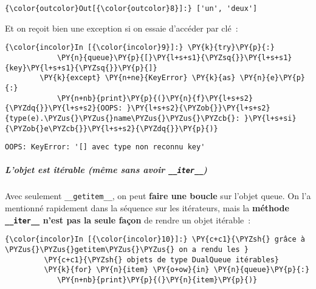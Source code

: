 \begin{Verbatim}[commandchars=\\\{\},frame=single,framerule=0.3mm,rulecolor=\color{cellframecolor}]
{\color{outcolor}Out[{\color{outcolor}8}]:} ['un', 'deux']
\end{Verbatim}
            
    Et on reçoit bien une exception si on essaie d'accéder par clé~:

    \begin{Verbatim}[commandchars=\\\{\},frame=single,framerule=0.3mm,rulecolor=\color{cellframecolor}]
{\color{incolor}In [{\color{incolor}9}]:} \PY{k}{try}\PY{p}{:}
            \PY{n}{queue}\PY{p}{[}\PY{l+s+s1}{\PYZsq{}}\PY{l+s+s1}{key}\PY{l+s+s1}{\PYZsq{}}\PY{p}{]}
        \PY{k}{except} \PY{n+ne}{KeyError} \PY{k}{as} \PY{n}{e}\PY{p}{:}
            \PY{n+nb}{print}\PY{p}{(}\PY{n}{f}\PY{l+s+s2}{\PYZdq{}}\PY{l+s+s2}{OOPS: }\PY{l+s+s2}{\PYZob{}}\PY{l+s+s2}{type(e).\PYZus{}\PYZus{}name\PYZus{}\PYZus{}\PYZcb{}: }\PY{l+s+si}{\PYZob{}e\PYZcb{}}\PY{l+s+s2}{\PYZdq{}}\PY{p}{)}
\end{Verbatim}


    \begin{Verbatim}[commandchars=\\\{\},frame=single,framerule=0.3mm,rulecolor=\color{cellframecolor}]
OOPS: KeyError: '[] avec type non reconnu key'
\end{Verbatim}

    \hypertarget{lobjet-est-ituxe9rable-muxeame-sans-avoir-__iter__}{%
\subparagraph{\texorpdfstring{L'objet est itérable (même sans avoir
\texttt{\_\_iter\_\_})}{L'objet est itérable (même sans avoir \_\_iter\_\_)}}\label{lobjet-est-ituxe9rable-muxeame-sans-avoir-__iter__}}

    Avec seulement \texttt{\_\_getitem\_\_}, on peut \textbf{faire une
boucle} sur l'objet queue. On l'a mentionné rapidement dans la séquence
sur les itérateurs, mais la \textbf{méthode \texttt{\_\_iter\_\_} n'est
pas la seule façon} de rendre un objet itérable~:

    \begin{Verbatim}[commandchars=\\\{\},frame=single,framerule=0.3mm,rulecolor=\color{cellframecolor}]
{\color{incolor}In [{\color{incolor}10}]:} \PY{c+c1}{\PYZsh{} grâce à \PYZus{}\PYZus{}getitem\PYZus{}\PYZus{} on a rendu les }
         \PY{c+c1}{\PYZsh{} objets de type DualQueue itérables}
         \PY{k}{for} \PY{n}{item} \PY{o+ow}{in} \PY{n}{queue}\PY{p}{:}
            \PY{n+nb}{print}\PY{p}{(}\PY{n}{item}\PY{p}{)}
\end{Verbatim}


